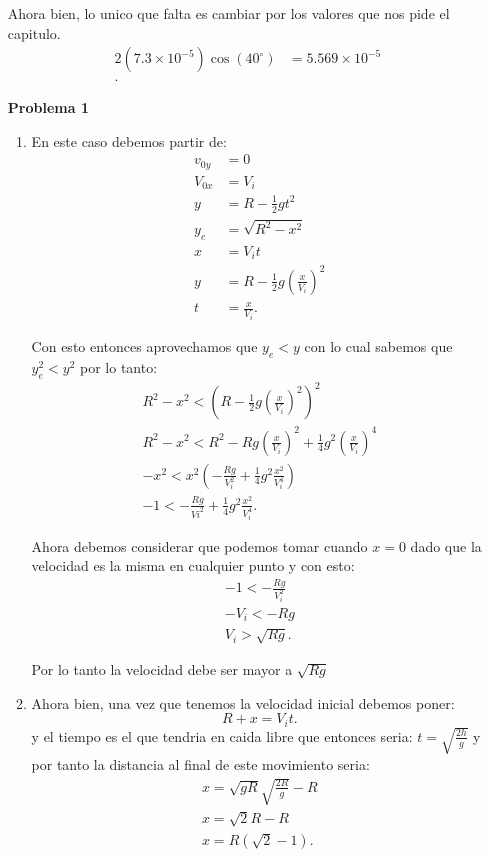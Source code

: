 \documentclass[12pt]{exam}
\begin{document}
\begin{enumerate}
    Ahora bien, lo unico que falta es cambiar por los valores que nos pide el capitulo.
    \begin{align*}
      2\left( 7.3\times 10^{-5} \right) \cos\left( 40^{\circ} \right) &= 5.569\times 10^{-5} \\
    .\end{align*}
  \item[\textbf{Problema 1}]

    \begin{enumerate}
      \item En este caso debemos partir de:
    \begin{align*}
      v_{0y}&= 0 \\
      V_{0x}&= V_{i} \\
      y &= R - \frac{1}{2}gt^2 \\
      y_{e} &= \sqrt{R^2-x^2}  \\
      x &= V_{i}t \\
      y &= R - \frac{1}{2}g\left( \frac{x}{V_{i}} \right)^2 \\
      t &= \frac{x}{V_{i}}
    .\end{align*}

    Con esto entonces aprovechamos que $y_{e}<y$ con lo cual sabemos que $y_{e}^2<y^2$ por lo tanto:
    \begin{align*}
      R^2 - x^2 < \left( R - \frac{1}{2}g\left( \frac{x}{V_{i}} \right)^2  \right)^2\\
      R^2 - x^2 < R^2 - Rg\left( \frac{x}{V_{i}} \right)^2 + \frac{1}{4}g^2\left( \frac{x}{V_{i}} \right)^{4}\\
      - x^2 < x^2 \left( -\frac{Rg}{V_{i}^2} + \frac{1}{4}g^2 \frac{x^2}{V_i^{4}} \right) \\
      -1 < - \frac{Rg}{Vi^2} + \frac{1}{4}g^2 \frac{x^2}{V_{i}^{4}}
    .\end{align*}

    Ahora debemos considerar que podemos tomar cuando $x=0$ dado que la velocidad es la misma en cualquier punto y con esto:
    \begin{align*}
      -1 < - \frac{Rg}{V_{i}^2}\\
      -V_{i} < - Rg \\
      V_{i} > \sqrt{Rg} 
    .\end{align*}

    Por lo tanto la velocidad debe ser mayor a $\sqrt{Rg} $
    
  \item Ahora bien, una vez que tenemos la velocidad inicial debemos poner: \[
  R + x = V_{i}t
  .\] y el tiempo es el que tendria en caida libre que entonces seria: $t=\sqrt{\frac{2h}{g}} $ y por tanto la distancia al final de este movimiento seria:
  \begin{align*}
    x = \sqrt{gR}\sqrt{\frac{2R}{g}}  - R \\
    x = \sqrt{2} R - R\\
    x = R\left( \sqrt{2} - 1 \right) 
  .\end{align*}
\end{enumerate}


\end{enumerate}
\end{document}
